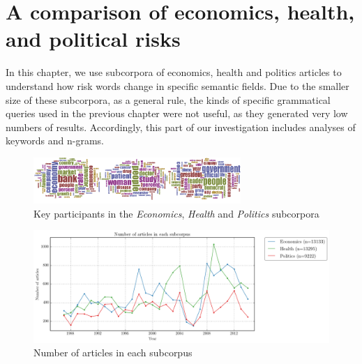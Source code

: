 
\chapter{A comparison of economics, health, and political risks}

In this chapter, we use subcorpora of economics, health and politics articles to understand how risk words change in specific semantic fields. Due to the smaller size of these subcorpora, as a general rule, the kinds of specific grammatical queries used in the previous chapter were not useful, as they generated very low numbers of results. Accordingly, this part of our investigation includes analyses of keywords and n-grams. 

            \begin{figure}[htb!]
            \centering
            \includegraphics[width=0.70\textwidth]{../images/clouds.png}
            \caption{Key participants in the \emph{Economics}, \emph{Health} and \emph{Politics} subcorpora}
            \label{fig:clouds}
            \end{figure}

            \begin{figure}[htb!]
            \centering
            \includegraphics[width=.70\textwidth]{../images/number-of-articles-in-each-subcorpus.png}
            \caption{Number of articles in each subcorpus}
            \label{fig:article_per_subcorpus}
            \end{figure}

